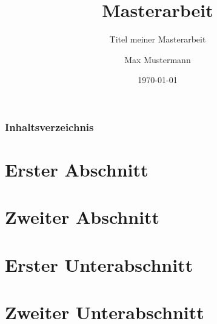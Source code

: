 \documentclass{beamer}
\title{Masterarbeit}
\subtitle{Titel meiner Masterarbeit}
\author{Max Mustermann}
\date{\today}
\institute{Hochschule Musterstadt}
\begin{document}
\begin{frame}
	\titlepage
\end{frame}

\begin{frame}
	\frametitle{Inhaltsverzeichnis}
	\tableofcontents
\end{frame}

\section{Erster Abschnitt}
\section{Zweiter Abschnitt}
\section{Erster Unterabschnitt}
\section{Zweiter Unterabschnitt}
\begin{frame}
\frametitle{\insertsection}
\framesubtitle{\insertsubsection}
~
\end{frame}
\end{document}
